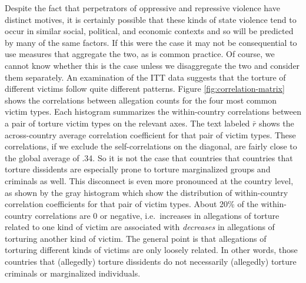 \documentclass[11pt]{article}
\begin{document}
Despite the fact that perpetrators of oppressive and repressive violence have distinct motives, it is certainly possible that these kinds of state violence tend to occur in similar social, political, and economic contexts and so will be predicted by many of the same factors. If this were the case it may not be consequential to use measures that aggregate the two, as is common practice. Of course, we cannot know whether this is the case unless we disaggregate the two and consider them separately. An examination of the ITT data suggests that the torture of different victims follow quite different patterns. Figure \ref{fig:correlation-matrix} shows the correlations between allegation counts for the four most common victim types. Each histogram summarizes the within-country correlations between a pair of torture victim types on the relevant axes. The text labeled $\bar{r}$ shows the across-country average correlation coefficient for that pair of victim types. These correlations, if we exclude the self-correlations on the diagonal, are fairly close to the global average of .34. So it is not the case that countries that countries that torture dissidents are especially prone to torture marginalized groups and criminals as well. This disconnect is even more pronounced at the country level, as shown by the gray histogram which show the distribution of within-country correlation coefficients for that pair of victim types. About 20\% of the within-country correlations are 0 or negative, i.e.\ increases in allegations of torture related to one kind of victim are associated with {\em decreases} in allegations of torturing another kind of victim. The general point is that allegations of torturing different kinds of victims are only loosely related. In other words, those countries that (allegedly) torture dissidents  do not necessarily (allegedly) torture criminals or marginalized individuals. 
\end{document}
